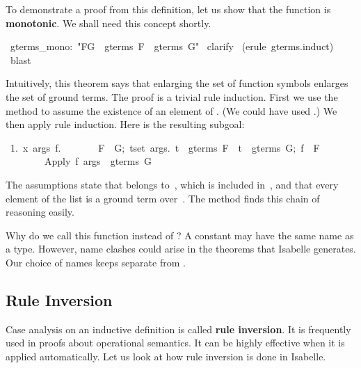 To demonstrate a proof from this definition, let us 
show that the function 
is \textbf{monotonic}.  We shall need this concept shortly.
\begin{isabelle}
\ gterms_mono:\ "F\isasymsubseteq G\ \isasymLongrightarrow \ gterms\ F\ \isasymsubseteq \ gterms\ G"\isanewline
{}\ clarify\isanewline
{}\ (erule\ gterms.induct)\isanewline
{}\ blast\isanewline
{}
\end{isabelle}
Intuitively, this theorem says that
enlarging the set of function symbols enlarges the set of ground 
terms. The proof is a trivial rule induction.
First we use the  method to assume the existence of an element of
.  (We could have used .)  We then
apply rule induction. Here is the resulting subgoal: 
\begin{isabelle}
\ 1.\ \isasymAnd x\ args\ f.\isanewline
\ \ \ \ \ \ \ \isasymlbrakk F\ \isasymsubseteq \ G;\ \isasymforall t\isasymin set\ args.\ t\ \isasymin \ gterms\ F\ \isasymand \ t\ \isasymin \ gterms\ G;\ f\ \isasymin \ F\isasymrbrakk \isanewline
\ \ \ \ \ \ \ \isasymLongrightarrow \ Apply\ f\ args\ \isasymin \ gterms\ G%
\end{isabelle}
%
The assumptions state that  belongs 
to~, which is included in~, and that every element of the list  is
a ground term over~.  The  method finds this chain of reasoning easily.  

\begin{warn}
Why do we call this function  instead 
of {}?  A constant may have the same name as a type.  However,
name  clashes could arise in the theorems that Isabelle generates. 
Our choice of names keeps {} separate from 
{}.
\end{warn}


\subsection{Rule Inversion}\label{sec:rule-inversion}

Case analysis on an inductive definition is called \textbf{rule inversion}. 
It is frequently used in proofs about operational semantics.  It can be
highly effective when it is applied automatically.  Let us look at how rule
inversion is done in Isabelle.

